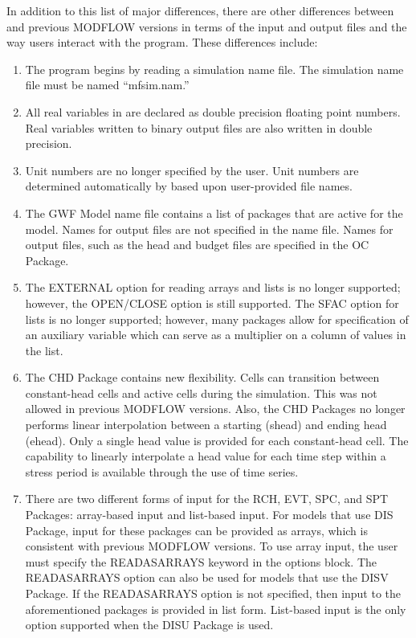In addition to this list of major differences, there are other differences between \mf and previous MODFLOW versions in terms of the input and output files and the way users interact with the program.  These differences include:

\begin{enumerate}

\item The \mf program begins by reading a simulation name file.  The simulation name file must be named ``mfsim.nam.''

\item All real variables in \mf are declared as double precision floating point numbers.  Real variables written to binary output files are also written in double precision.

\item Unit numbers are no longer specified by the user.  Unit numbers are determined automatically by \mf based upon user-provided file names.

\item The GWF Model name file contains a list of packages that are active for the model.  Names for output files are not specified in the name file.  Names for output files, such as the head and budget files are specified in the OC Package.

\item The EXTERNAL option for reading arrays and lists is no longer supported; however, the OPEN/CLOSE option is still supported.  The SFAC option for lists is no longer supported; however, many packages allow for specification of an auxiliary variable which can serve as a multiplier on a column of values in the list.

\item The CHD Package contains new flexibility.  Cells can transition between constant-head cells and active cells during the simulation.  This was not allowed in previous MODFLOW versions.  Also, the CHD Packages no longer performs linear interpolation between a starting (shead) and ending head (ehead).  Only a single head value is provided for each constant-head cell.  The capability to linearly interpolate a head value for each time step within a stress period is available through the use of time series.

\item There are two different forms of input for the RCH, EVT, SPC, and SPT Packages: array-based input and list-based input.  For models that use DIS Package, input for these packages can be provided as arrays, which is consistent with previous MODFLOW versions.  To use array input, the user must specify the READASARRAYS keyword in the options block.  The READASARRAYS option can also be used for models that use the DISV Package.  If the READASARRAYS option is not specified, then input to the aforementioned packages is provided in list form.  List-based input is the only option supported when the DISU Package is used.


\end{enumerate}
